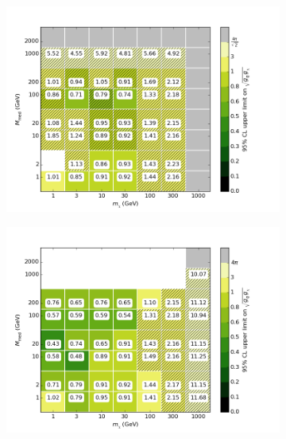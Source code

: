 \begin{figure}[h]
  \centering
    \begin{subfigure}[t]{0.45\textwidth}
      \centering
      \includegraphics[width=1.\textwidth]{figures/grid_allpoints_SVD_rat05.png}
      \caption{}
    \end{subfigure}
    \begin{subfigure}[t]{0.45\textwidth}
      \centering
      \includegraphics[width=1.\textwidth]{figures/grid_allpoints_SVD_rat1.png}
      \caption{}
    \end{subfigure}
    \begin{subfigure}[t]{0.45\textwidth}
      \centering

\end{subfigure}
\end{figure}
